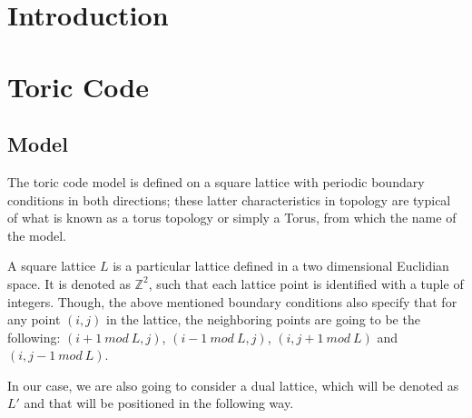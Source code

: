 \documentclass[12pt]{report}
\begin{document}
	
	\chapter{Introduction}
	
	\chapter{Toric Code}
	\section{Model}
	
	
	\begin{minipage}{1\textwidth}
		
		The toric code model is defined on a square lattice with periodic boundary conditions in both directions; these latter characteristics in topology are typical of what is known as a torus topology or simply a Torus, from which the name of the model.\newline
		
		A square lattice $L$ is a particular lattice defined in a two dimensional Euclidian space. It is denoted as $\mathbb{Z}^{2}$, such that each lattice point is identified with a tuple of integers. Though, the above mentioned boundary conditions also specify that for any point $(i, j)$ in the lattice, the neighboring points are going to be the following: $(i+1 \ mod \ L, j)$, $(i-1 \ mod \ L, j)$, $(i, j+1 \ mod \ L)$ and $(i, j-1 \ mod \ L)$.  \newline
		
		In our case, we are also going to consider a dual lattice, which will be denoted as $L'$ and that will be positioned in the following way.\newline
		
		\begin{center}
		
\end{center}
\end{minipage}
\end{document}
